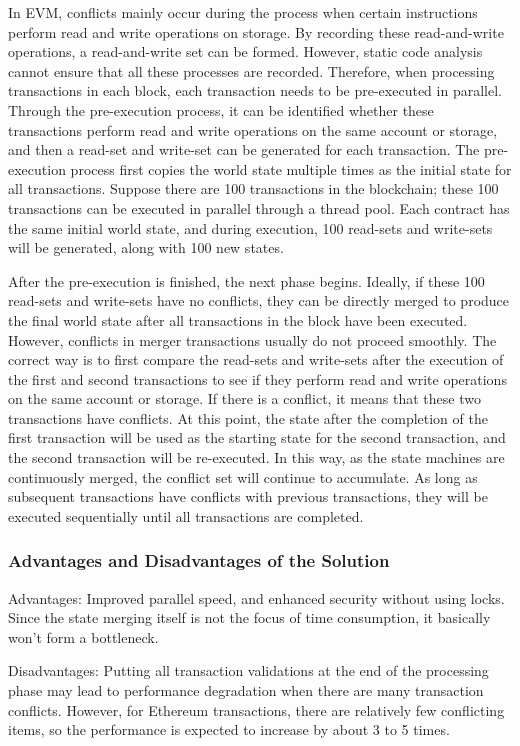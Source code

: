In EVM, conflicts mainly occur during the process when certain instructions perform read and write operations on storage. By recording these read-and-write operations, a read-and-write set can be formed. However, static code analysis cannot ensure that all these processes are recorded. Therefore, when processing transactions in each block, each transaction needs to be pre-executed in parallel. Through the pre-execution process, it can be identified whether these transactions perform read and write operations on the same account or storage, and then a read-set and write-set can be generated for each transaction. The pre-execution process first copies the world state multiple times as the initial state for all transactions. Suppose there are 100 transactions in the blockchain; these 100 transactions can be executed in parallel through a thread pool. Each contract has the same initial world state, and during execution, 100 read-sets and write-sets will be generated, along with 100 new states.

After the pre-execution is finished, the next phase begins. Ideally, if these 100 read-sets and write-sets have no conflicts, they can be directly merged to produce the final world state after all transactions in the block have been executed. However, conflicts in merger transactions usually do not proceed smoothly. The correct way is to first compare the read-sets and write-sets after the execution of the first and second transactions to see if they perform read and write operations on the same account or storage. If there is a conflict, it means that these two transactions have conflicts. At this point, the state after the completion of the first transaction will be used as the starting state for the second transaction, and the second transaction will be re-executed. In this way, as the state machines are continuously merged, the conflict set will continue to accumulate. As long as subsequent transactions have conflicts with previous transactions, they will be executed sequentially until all transactions are completed.

\subsubsection{Advantages and Disadvantages of the Solution}

Advantages: Improved parallel speed, and enhanced security without using locks. Since the state merging itself is not the focus of time consumption, it basically won't form a bottleneck.

Disadvantages: Putting all transaction validations at the end of the processing phase may lead to performance degradation when there are many transaction conflicts. However, for Ethereum transactions, there are relatively few conflicting items, so the performance is expected to increase by about 3 to 5 times.
